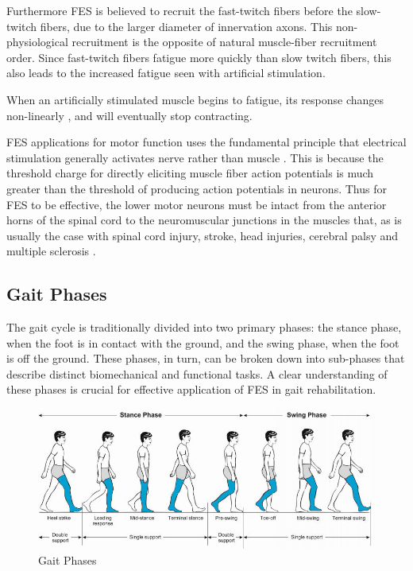 Furthermore FES is believed to recruit the fast-twitch fibers before the slow-twitch fibers, due to the larger diameter of innervation axons. This non-physiological recruitment is the opposite of natural muscle-fiber recruitment order. Since fast-twitch fibers fatigue more quickly than slow twitch fibers, this also leads to the increased fatigue seen with artificial stimulation. \cite{lynch_functional_2008}

When an artificially stimulated muscle begins to fatigue, its response changes non-linearly \cite{lynch_functional_2008}, and will eventually stop contracting. 

FES applications for motor function uses the fundamental principle that electrical stimulation generally activates nerve rather than muscle \cite{peckham_functional_2005}. This is because the threshold charge for directly eliciting muscle fiber action potentials is much greater than the threshold of producing action potentials in neurons. Thus for FES to be effective, the lower motor neurons must be intact from the anterior horns of the spinal cord to the neuromuscular junctions in the muscles that, as is usually the case with spinal cord injury, stroke, head injuries, cerebral palsy and multiple sclerosis \cite{gregory_recruitment_2005}. 

\subsection{Gait Phases}
The gait cycle is traditionally divided into two primary phases: the stance phase, when the foot is in contact with the ground, and the swing phase, when the foot is off the ground. These phases, in turn, can be broken down into sub-phases that describe distinct biomechanical and functional tasks. A clear understanding of these phases is crucial for effective application of FES in gait rehabilitation.

\begin{figure}
    \centering
    \includegraphics[width=0.9\linewidth]{images/Phases-of-the-normal-gait-cycle.png}
    \caption{Gait Phases \cite{pirker_gait_2017}}
    \label{fig:enter-label}
\end{figure}

